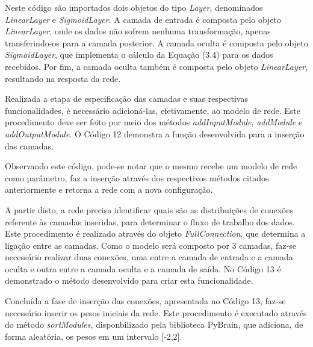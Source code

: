 

Neste código são importados dois objetos do tipo \textit{Layer}, denominados \textit{LinearLayer} e \textit{SigmoidLayer}. A camada de entrada é composta pelo objeto \textit{LinearLayer}, onde os dados não sofrem nenhuma transformação, apenas transferindo-os para a camada posterior. A camada oculta é composta pelo objeto \textit{SigmoidLayer}, que implementa o cálculo da Equação (3.4) para os dados recebidos. Por fim, a camada oculta também é composta pelo objeto \textit{LinearLayer}, resultando na resposta da rede.   

Realizada a etapa de especificação das camadas e suas respectivas funcionalidades, é necessário adicioná-las, efetivamente, ao modelo de rede. Este procedimento deve ser feito por meio dos métodos \textit{addInputModule}, \textit{addModule} e \textit{addOutputModule}. O Código 12 demonstra a função desenvolvida para a inserção das camadas.



Observando este código, pode-se notar que o mesmo recebe um modelo de rede como parâmetro, faz a inserção através dos respectivos métodos citados anteriormente e retorna a rede com a nova configuração.

A partir disto, a rede precisa identificar quais são as distribuições de conexões referente às camadas inseridas, para determinar o fluxo de trabalho dos dados. Este procedimento é realizado através do objeto \textit{FullConnection}, que determina a ligação entre as camadas. Como o modelo será composto por 3 camadas, faz-se necessário realizar duas conexões, uma entre a camada de entrada e a camada oculta e outra entre a camada oculta e a camada de saída. No Código 13 é demonstrado o método desenvolvido para criar esta funcionalidade.



Concluída a fase de inserção das conexões, apresentada no Código 13, faz-se necessário inserir os pesos iniciais da rede. Este procedimento é executado através do método \textit{sortModules}, disponbilizado pela biblioteca PyBrain, que adiciona, de forma aleatória, os pesos em um intervalo [-2,2].

